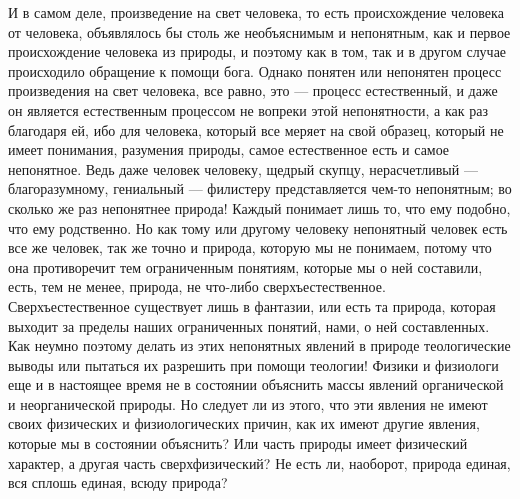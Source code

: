 \documentclass[12pt]{article}
\begin{document}
И в самом деле, произведение на свет человека, то есть происхождение человека от человека, объявлялось бы столь же необъяснимым и непонятным, как и первое происхождение человека из природы, и поэтому как в том, так и в другом случае происходило обращение к помощи бога. Однако понятен или непонятен процесс произведения на свет человека, все равно, это --- процесс естественный, и даже он является естественным процессом не вопреки этой непонятности, а как раз благодаря ей, ибо для человека, который все меряет на свой образец, который не имеет понимания, разумения природы, самое естественное есть и самое непонятное. Ведь даже человек человеку, щедрый скупцу, нерасчетливый --- благоразумному, гениальный --- филистеру представляется чем-то непонятным; во сколько же раз непонятнее природа! Каждый понимает лишь то, что ему подобно, что ему родственно. Но как тому или другому человеку непонятный человек есть все же человек, так же точно и природа, которую мы не понимаем, потому что она противоречит тем ограниченным понятиям, которые мы о ней составили, есть, тем не менее, природа, не что-либо сверхъестественное. Сверхъестественное существует лишь в фантазии, или есть та природа, которая выходит за пределы наших ограниченных понятий, нами, о ней составленных. Как неумно поэтому делать из этих непонятных явлений в природе теологические выводы или пытаться их разрешить при помощи теологии! Физики и физиологи еще и в настоящее время не в состоянии объяснить массы явлений органической и неорганической природы. Но следует ли из этого, что эти явления не имеют своих физических и физиологических причин, как их имеют другие явления, которые мы в состоянии объяснить? Или часть природы имеет физический характер, а другая часть сверхфизический? Не есть ли, наоборот, природа единая, вся сплошь единая, всюду природа? 
\end{document}
